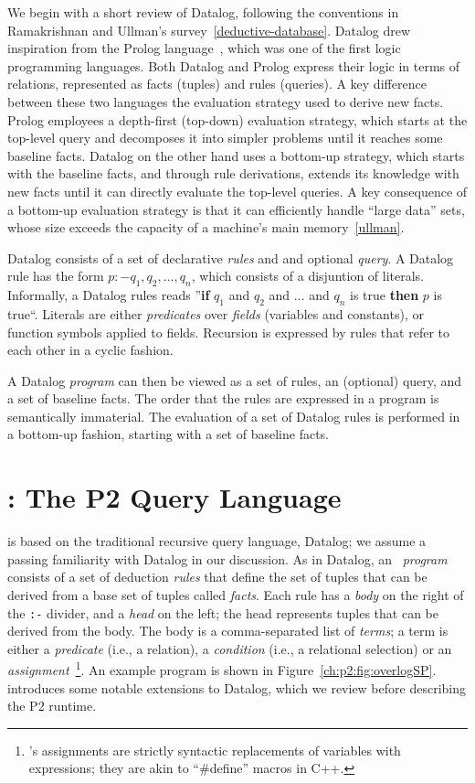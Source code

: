 We begin with a short review of Datalog, following the conventions in Ramakrishnan and Ullman's 
survey~\ref{deductive-database}. Datalog drew inspiration from the Prolog language~\cite{prolog}, 
which was one of the first logic programming languages. Both Datalog and Prolog express their logic in 
terms of relations, represented as facts (tuples) and rules (queries). A key difference between these two 
languages the evaluation strategy used to derive new facts. Prolog employees a depth-first (top-down)
evaluation strategy, which starts at the top-level query and decomposes it into simpler problems
until it reaches some baseline facts. Datalog on the other hand uses a bottom-up strategy, which starts
with the baseline facts, and through rule derivations, extends its knowledge with new facts until it can
directly evaluate the top-level queries. A key consequence of a bottom-up evaluation strategy is that
it can efficiently handle ``large data'' sets, whose size exceeds the capacity of a machine's main memory~\ref{ullman}.

Datalog consists of a set of declarative {\em rules} and
and optional {\em query}. A Datalog rule has the form $p :- q_1, q_2, \ldots, q_n$, which consists 
of a disjuntion of literals. Informally, a Datalog rules reads ''{\bf if} $q_1$ and $q_2$ and $\ldots$
and $q_n$ is true {\bf then} $p$ is true``. Literals are either {\em predicates} over {\em fields} (variables
and constants), or function symbols applied to fields. Recursion is expressed by rules that refer to
each other in a cyclic fashion. 

A Datalog {\em program} can then be viewed as a set of rules, an (optional) query, and a set of baseline facts.  
The order that the rules are expressed in a program is semantically immaterial.
The evaluation of a set of Datalog rules is performed in a bottom-up fashion, starting with a set of 
baseline facts.



\section{\OVERLOG: The P2 Query Language}
\label{ch:p2:sec:overlog}

\OVERLOG is based on the traditional recursive query language, Datalog; we assume a passing familiarity 
with Datalog in our discussion.  As in Datalog, an \OVERLOG~{\em program} consists of a set of deduction 
{\em rules} that define the set of tuples that can be derived from a base set of tuples called {\em facts}. 
Each rule has a {\em body} on the right of the \texttt{:-} divider, and a {\em head} on the left; the head 
represents tuples that can be derived from the body.  The body is a comma-separated list of {\em terms}; 
a term is either a {\em predicate} (i.e., a relation), a {\em condition} (i.e., a relational selection) or an 
{\em assignment}~\footnote{\OVERLOG's assignments are strictly syntactic replacements of variables with 
expressions; they are akin to ``\#define'' macros in C++.}.  An example \OVERLOG program is shown in 
Figure~\ref{ch:p2:fig:overlogSP}.  \OVERLOG introduces some notable extensions to Datalog, which we review
before describing the P2 runtime.

